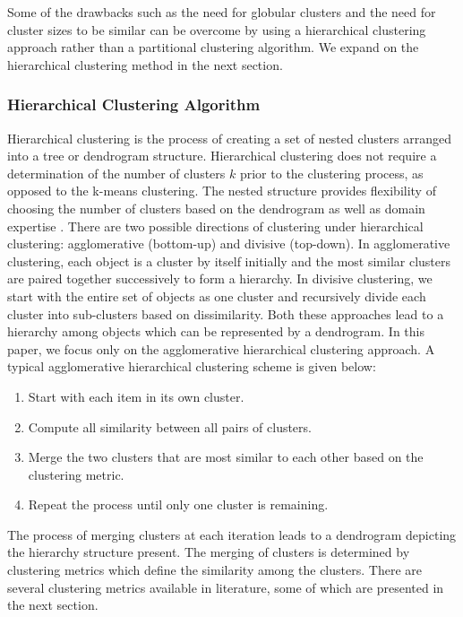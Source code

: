 Some of the drawbacks such as the need for globular clusters and the need for cluster sizes to be similar can be overcome by using a hierarchical clustering approach rather than a partitional clustering algorithm. We expand on the hierarchical clustering method in the next section. 

\subsubsection{Hierarchical Clustering Algorithm}

Hierarchical clustering is the process of creating a set of nested clusters arranged into a tree or dendrogram structure. Hierarchical clustering does not require a determination of the number of clusters $k$ prior to the clustering process, as opposed to the k-means clustering. The nested structure provides flexibility of choosing the number of clusters based on the dendrogram as well as domain expertise \cite{jain_data_1999}. There are two possible directions of clustering under hierarchical clustering: agglomerative (bottom-up) and divisive (top-down). In agglomerative clustering, each object is a cluster by itself initially and the most similar clusters are paired together successively to form a hierarchy. In divisive clustering, we start with the entire set of objects as one cluster and recursively divide each cluster into sub-clusters based on dissimilarity. Both these approaches lead to a hierarchy among objects which can be represented by a dendrogram. In this paper, we focus only on the agglomerative hierarchical clustering approach. A typical agglomerative hierarchical clustering scheme is given below:

\begin{enumerate}
\item Start with each item in its own cluster. 
\item Compute all similarity between all pairs of clusters. 
\item Merge the two clusters that are most similar to each other based on the clustering metric.
\item Repeat the process until only one cluster is remaining.
\end{enumerate}

The process of merging clusters at each iteration leads to a dendrogram depicting the hierarchy structure present. The merging of clusters is determined by clustering metrics which define the similarity among the clusters. There are several clustering metrics available in literature, some of which are presented in the next section. 

